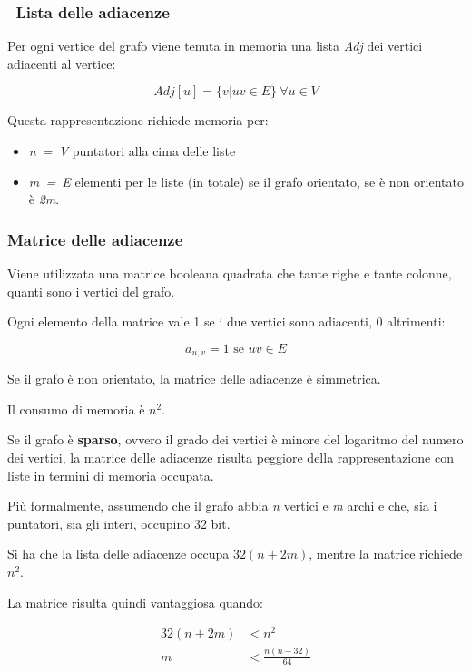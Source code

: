 \subsubsection{~Lista delle adiacenze}\label{lista-delle-adiacenze}

Per ogni vertice del grafo viene tenuta in memoria una lista \textit{Adj} dei vertici
adiacenti al vertice:

$$
Adj[u] = \{v | uv \in E\} \: \forall u \in V 
$$

Questa rappresentazione richiede memoria per:

\begin{itemize}
\tightlist
\item
  \textit{n\ =\ \textbar{}V\textbar{}} puntatori alla cima delle liste
\item
  \textit{m\ =\ \textbar{}E\textbar{}} elementi per le liste (in totale)
  se il grafo orientato, se è non orientato è \textit{2m}.
\end{itemize}

\subsubsection{Matrice delle adiacenze}\label{matrice-delle-adiacenze}

Viene utilizzata una matrice booleana quadrata che tante righe e tante
colonne, quanti sono i vertici del grafo.

Ogni elemento della matrice vale 1 se i due vertici sono adiacenti, 0
altrimenti:

$$
a_{u,v} = 1 \text{ se } uv \in E
$$

Se il grafo è non orientato, la matrice delle adiacenze è simmetrica.

Il consumo di memoria è $n^2$.

Se il grafo è \textbf{sparso}, ovvero il grado dei vertici è minore del
logaritmo del numero dei vertici, la matrice delle adiacenze risulta
peggiore della rappresentazione con liste in termini di memoria
occupata.

Più formalmente, assumendo che il grafo abbia \textit{n} vertici e \textit{m} archi e che, sia i puntatori, sia gli interi, occupino 32 bit.

Si ha che la lista delle adiacenze occupa $32(n+2m)$, mentre la matrice richiede $n^2$.

La matrice risulta quindi vantaggiosa quando:

\begin{align*}
	32(n+2m) &< n^2 \\
	m &< \frac{n(n-32)}{64}
\end{align*}


